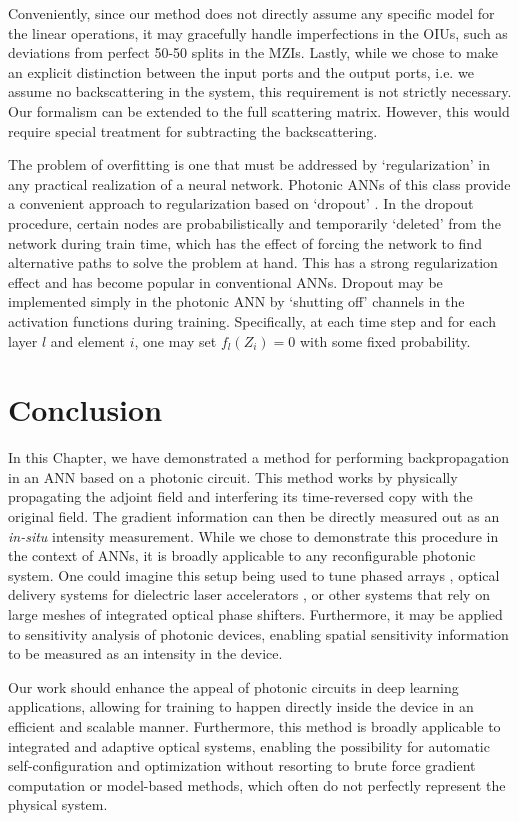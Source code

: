 Conveniently, since our method does not directly assume any specific model for the linear operations, it may gracefully handle imperfections in the OIUs, such as deviations from perfect 50-50 splits in the MZIs.  Lastly, while we chose to make an explicit distinction between the input ports and the output ports, i.e. we assume no backscattering in the system, this requirement is not strictly necessary. Our formalism can be extended to the full scattering matrix.  However, this would require special treatment for subtracting the backscattering. 

The problem of overfitting is one that must be addressed by `regularization' in any practical realization of a neural network.  Photonic ANNs of this class provide a convenient approach to regularization based on `dropout' \cite{srivastava2014dropout}.  In the dropout procedure, certain nodes are probabilistically and temporarily `deleted’ from the network during train time, which has the effect of forcing the network to find alternative paths to solve the problem at hand.  This has a strong regularization effect and has become popular in conventional ANNs.  Dropout may be implemented simply in the photonic ANN by `shutting off’ channels in the activation functions during training.  Specifically, at each time step and for each layer $l$ and element $i$, one may set $f_l(Z_i) = 0$ with some fixed probability.


\section{Conclusion}

In this Chapter, we have demonstrated a method for performing backpropagation in an ANN based on a photonic circuit.  This method works by physically propagating the adjoint field and interfering its time-reversed copy with the original field.  The gradient information can then be directly measured out as an \textit{in-situ} intensity measurement. While we chose to demonstrate this procedure in the context of ANNs, it is broadly applicable to any reconfigurable photonic system.  One could imagine this setup being used to tune phased arrays \cite{sun2013large}, optical delivery systems for dielectric laser accelerators \cite{hughes_-chip_2018}, or other systems that rely on large meshes of integrated optical phase shifters.  Furthermore, it may be applied to sensitivity analysis of photonic devices, enabling spatial sensitivity information to be measured as an intensity in the device.

Our work should enhance the appeal of photonic circuits in deep learning applications, allowing for training to happen directly inside the device in an efficient and scalable manner.  Furthermore, this method is broadly applicable to integrated and adaptive optical systems, enabling the possibility for automatic self-configuration and optimization without resorting to brute force gradient computation or model-based methods, which often do not perfectly represent the physical system.
